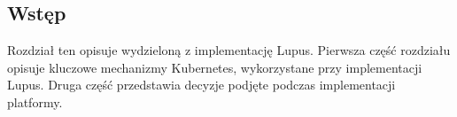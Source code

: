 \subsection{Wstęp}
Rozdział ten opisuje wydzieloną z implementację Lupus. Pierwsza część rozdziału opisuje kluczowe mechanizmy Kubernetes, wykorzystane przy implementacji Lupus. Druga część przedstawia decyzje podjęte podczas implementacji platformy.